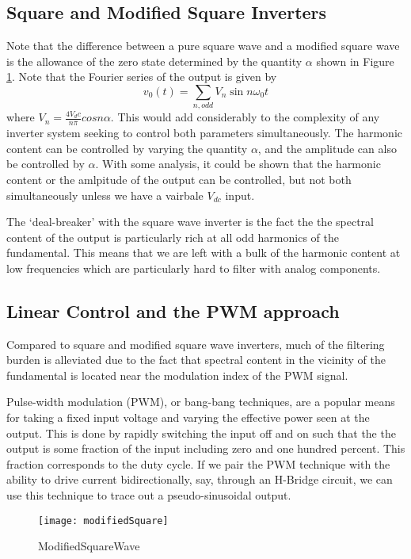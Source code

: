 \subsection{Square and Modified Square Inverters}
 Note that the difference between a pure square wave and a modified square wave is the allowance of the zero state determined by the quantity $\alpha$ shown in Figure \ref{modifiedSquare}. Note that the Fourier series of the output is given by 
\begin{equation}
v_0(t)=\sum\limits_{n,odd}V_n\sin{n\omega_0t}
\end{equation}
where $V_n=\frac{4V_dc}{n\pi}cos{n\alpha}$. This would add considerably to the complexity of any inverter system seeking to control both parameters simultaneously. The harmonic content can be controlled by varying the quantity $\alpha$, and the amplitude can also be controlled by $\alpha$. With some analysis, it could be shown that the harmonic content or the amlpitude of the output can be controlled, but not both simultaneously unless we have a vairbale $V_{dc}$ input. 

The `deal-breaker' with the square wave inverter is the fact the the spectral content of the output is particularly rich at all odd harmonics of the fundamental. This means that we are left with a bulk of the harmonic content at low frequencies which are particularly hard to filter with analog components. 

\subsection{Linear Control and the PWM approach}
Compared to square and modified square wave inverters, much of the filtering burden is alleviated due to the fact that spectral content in the vicinity of the fundamental is located near the modulation index of the PWM signal.

Pulse-width modulation (PWM), or bang-bang techniques, are a popular means for taking a fixed input voltage and varying the effective power seen at the output. This is done by rapidly switching the input off and on such that the the output is some fraction of the input including zero and one hundred percent. This fraction corresponds to the duty cycle. If we pair the PWM technique with the ability to drive current bidirectionally, say, through an H-Bridge circuit, we can use this technique to trace out a pseudo-sinusoidal output. 

\begin{figure}
\centering
\texttt{[image: modifiedSquare]}
\caption{ModifiedSquareWave}
\label{modifiedSquare}
\end{figure}


